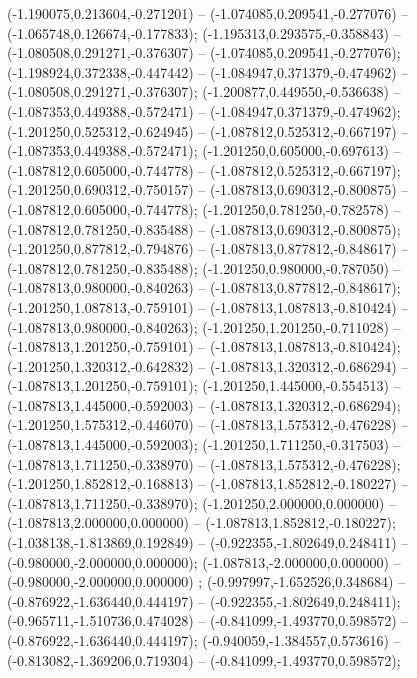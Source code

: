  (-1.190075,0.213604,-0.271201) -- (-1.074085,0.209541,-0.277076) -- (-1.065748,0.126674,-0.177833);
 (-1.195313,0.293575,-0.358843) -- (-1.080508,0.291271,-0.376307) -- (-1.074085,0.209541,-0.277076);
 (-1.198924,0.372338,-0.447442) -- (-1.084947,0.371379,-0.474962) -- (-1.080508,0.291271,-0.376307);
 (-1.200877,0.449550,-0.536638) -- (-1.087353,0.449388,-0.572471) -- (-1.084947,0.371379,-0.474962);
 (-1.201250,0.525312,-0.624945) -- (-1.087812,0.525312,-0.667197) -- (-1.087353,0.449388,-0.572471);
 (-1.201250,0.605000,-0.697613) -- (-1.087812,0.605000,-0.744778) -- (-1.087812,0.525312,-0.667197);
 (-1.201250,0.690312,-0.750157) -- (-1.087813,0.690312,-0.800875) -- (-1.087812,0.605000,-0.744778);
 (-1.201250,0.781250,-0.782578) -- (-1.087812,0.781250,-0.835488) -- (-1.087813,0.690312,-0.800875);
 (-1.201250,0.877812,-0.794876) -- (-1.087813,0.877812,-0.848617) -- (-1.087812,0.781250,-0.835488);
 (-1.201250,0.980000,-0.787050) -- (-1.087813,0.980000,-0.840263) -- (-1.087813,0.877812,-0.848617);
 (-1.201250,1.087813,-0.759101) -- (-1.087813,1.087813,-0.810424) -- (-1.087813,0.980000,-0.840263);
 (-1.201250,1.201250,-0.711028) -- (-1.087813,1.201250,-0.759101) -- (-1.087813,1.087813,-0.810424);
 (-1.201250,1.320312,-0.642832) -- (-1.087813,1.320312,-0.686294) -- (-1.087813,1.201250,-0.759101);
 (-1.201250,1.445000,-0.554513) -- (-1.087813,1.445000,-0.592003) -- (-1.087813,1.320312,-0.686294);
 (-1.201250,1.575312,-0.446070) -- (-1.087813,1.575312,-0.476228) -- (-1.087813,1.445000,-0.592003);
 (-1.201250,1.711250,-0.317503) -- (-1.087813,1.711250,-0.338970) -- (-1.087813,1.575312,-0.476228);
 (-1.201250,1.852812,-0.168813) -- (-1.087813,1.852812,-0.180227) -- (-1.087813,1.711250,-0.338970);
 (-1.201250,2.000000,0.000000) -- (-1.087813,2.000000,0.000000) -- (-1.087813,1.852812,-0.180227);
 (-1.038138,-1.813869,0.192849) -- (-0.922355,-1.802649,0.248411) -- (-0.980000,-2.000000,0.000000);
 (-1.087813,-2.000000,0.000000) -- (-0.980000,-2.000000,0.000000) ;
 (-0.997997,-1.652526,0.348684) -- (-0.876922,-1.636440,0.444197) -- (-0.922355,-1.802649,0.248411);
 (-0.965711,-1.510736,0.474028) -- (-0.841099,-1.493770,0.598572) -- (-0.876922,-1.636440,0.444197);
 (-0.940059,-1.384557,0.573616) -- (-0.813082,-1.369206,0.719304) -- (-0.841099,-1.493770,0.598572);
